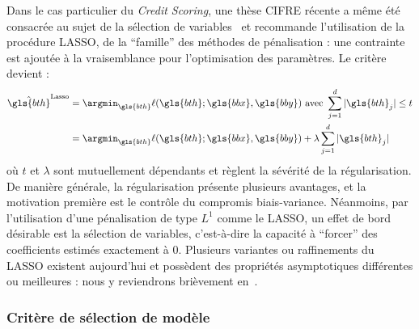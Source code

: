 Dans le cas particulier du \textit{Credit Scoring}, une thèse CIFRE récente a même été consacrée au sujet de la sélection de variables~\cite{vital2016} et recommande l'utilisation de la procédure LASSO, de la ``famille'' des méthodes de pénalisation : une contrainte est ajoutée à la vraisemblance pour l'optimisation des paramètres. Le critère devient :
\begin{align*}
\hat{\gls{bth}}^{\text{Lasso}} & = \argmin_{\gls{bth}} \ell(\gls{bth};\gls{bbx},\gls{bby}) \text{ avec } \sum_{j=1}^d |\gls{bth}_j| \leq t \\
 & = \argmin_{\gls{bth}}  \ell(\gls{bth};\gls{bbx},\gls{bby}) + \lambda \sum_{j=1}^d |\gls{bth}_j|
\end{align*}
où $t$ et $\lambda$ sont mutuellement dépendants et règlent la sévérité de la régularisation. De manière générale, la régularisation présente plusieurs avantages, et la motivation première est le contrôle du compromis biais-variance. Néanmoins, par l'utilisation d'une pénalisation de type $L^1$ comme le LASSO, un effet de bord désirable est la sélection de variables, c'est-à-dire la capacité à ``forcer'' des coefficients estimés exactement à $0$. Plusieurs variantes ou raffinements du LASSO existent aujourd'hui et possèdent des propriétés asymptotiques différentes ou meilleures : nous y reviendrons brièvement en~.


\subsubsection{Critère de sélection de modèle} \label{subsubsec:choix_modele}

